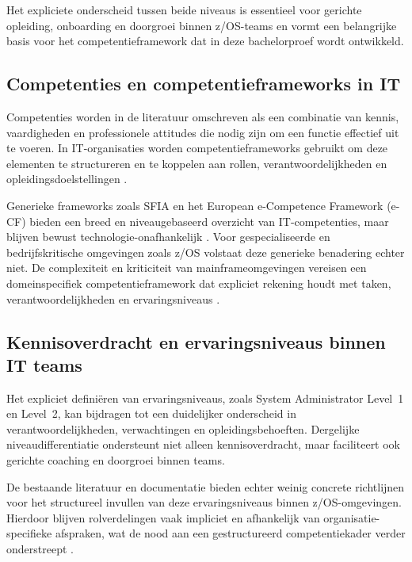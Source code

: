 Het expliciete onderscheid tussen beide niveaus is essentieel voor gerichte opleiding, onboarding en doorgroei binnen z/OS-teams en vormt een belangrijke basis voor het competentieframework dat in deze bachelorproef wordt ontwikkeld.


\subsection{Competenties en competentieframeworks in IT}

Competenties worden in de literatuur omschreven als een combinatie van kennis, vaardigheden en professionele attitudes die nodig zijn om een functie effectief uit te voeren. In IT-organisaties worden competentieframeworks gebruikt om deze elementen te structureren en te koppelen aan rollen, verantwoordelijkheden en opleidingsdoelstellingen \autocite{ITILFoundation}.

Generieke frameworks zoals SFIA en het European e-Competence Framework (e-CF) bieden een breed en niveaugebaseerd overzicht van IT-competenties, maar blijven bewust technologie-onafhankelijk \autocite{SFIA9,eCF2020}. Voor gespecialiseerde en bedrijfskritische omgevingen zoals z/OS volstaat deze generieke benadering echter niet. De complexiteit en kriticiteit van mainframeomgevingen vereisen een domeinspecifiek competentieframework dat expliciet rekening houdt met taken, verantwoordelijkheden en ervaringsniveaus \autocite{IBMRedbookzOS,IBMABCsZOSV1}.


\subsection{Kennisoverdracht en ervaringsniveaus binnen IT teams}

Het expliciet definiëren van ervaringsniveaus, zoals System Administrator Level~1 en Level~2, kan bijdragen tot een duidelijker onderscheid in verantwoordelijkheden, verwachtingen en opleidingsbehoeften. Dergelijke niveaudifferentiatie ondersteunt niet alleen kennisoverdracht, maar faciliteert ook gerichte coaching en doorgroei binnen teams.

De bestaande literatuur en documentatie bieden echter weinig concrete richtlijnen voor het structureel invullen van deze ervaringsniveaus binnen z/OS-omgevingen. Hierdoor blijven rolverdelingen vaak impliciet en afhankelijk van organisatie-specifieke afspraken, wat de nood aan een gestructureerd competentiekader verder onderstreept \autocite{IBMzOSOverview}.


